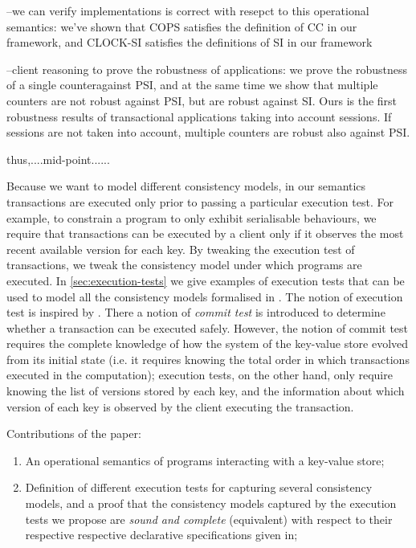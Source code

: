 --we can verify implementations is correct with resepct to this
operational semantics: we've shown that COPS satisfies the definition
of CC in our framework,  and CLOCK-SI satisfies the definitions of SI
in our framework


--client reasoning to prove the robustness of applications: 
we prove the robustness of a single counteragainst PSI, and 
at the same time we show that multiple counters are not robust 
against PSI, but are robust against SI. Ours is the first robustness 
results of transactional applications taking into account sessions. 
If sessions are not taken into account, multiple counters are robust 
also against PSI.


thus,....mid-point......









Because we want to model different consistency models, in our semantics 
transactions are executed only prior to passing a particular execution test. For example, 
to constrain a program to only exhibit serialisable behaviours, we require that 
transactions can be executed by a client only if it observes the most 
recent available version for each key. By tweaking the execution test 
of transactions, we tweak the consistency model under which programs 
are executed. In \cref{sec:execution-tests} we give examples of execution tests 
that can be used to model all the consistency models formalised in \cite{framework-concur}.
The notion of execution test is inspired by \cite{seebelieve}. There a notion of \emph{commit test} is introduced 
to determine whether a transaction can be executed safely. However, 
the notion of commit test requires the complete knowledge of 
how the system of the key-value store evolved from its 
initial state (i.e. it requires knowing the total order in which transactions executed in 
the computation); execution tests, on the other hand, only require
knowing the list of versions stored by each key, and the 
information about which version of each key is observed 
by the client executing the transaction.

Contributions of the paper: 
\begin{enumerate}
\item An operational semantics of programs interacting with a key-value store; 
\item Definition of different execution tests for capturing several consistency models,
and a proof that the consistency models captured by the execution tests we propose 
are \emph{sound and complete} (equivalent) with respect to their respective  respective declarative specifications 
given in\cite{framework-concur};

\end{enumerate}

